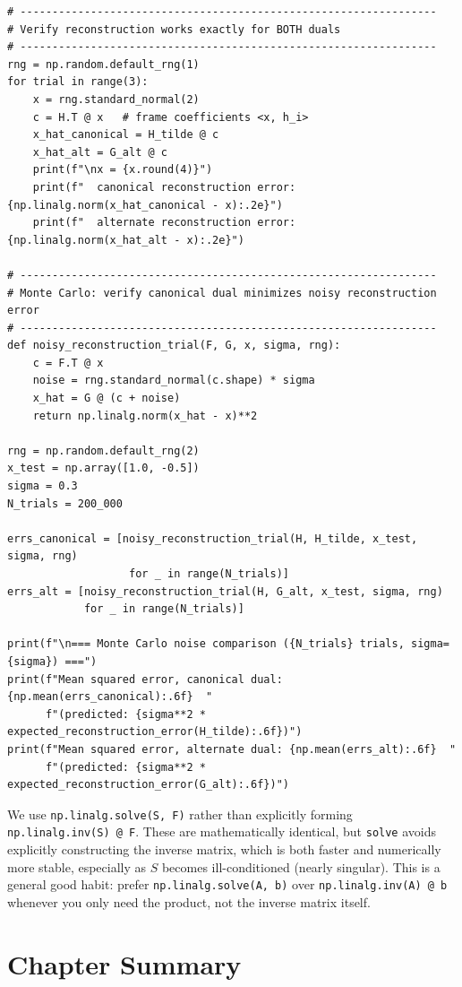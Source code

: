 \begin{lstlisting}[caption={Canonical and alternate dual frames, and stability comparison}]
# -----------------------------------------------------------------
# Verify reconstruction works exactly for BOTH duals
# -----------------------------------------------------------------
rng = np.random.default_rng(1)
for trial in range(3):
    x = rng.standard_normal(2)
    c = H.T @ x   # frame coefficients <x, h_i>
    x_hat_canonical = H_tilde @ c
    x_hat_alt = G_alt @ c
    print(f"\nx = {x.round(4)}")
    print(f"  canonical reconstruction error: {np.linalg.norm(x_hat_canonical - x):.2e}")
    print(f"  alternate reconstruction error: {np.linalg.norm(x_hat_alt - x):.2e}")

# -----------------------------------------------------------------
# Monte Carlo: verify canonical dual minimizes noisy reconstruction error
# -----------------------------------------------------------------
def noisy_reconstruction_trial(F, G, x, sigma, rng):
    c = F.T @ x
    noise = rng.standard_normal(c.shape) * sigma
    x_hat = G @ (c + noise)
    return np.linalg.norm(x_hat - x)**2

rng = np.random.default_rng(2)
x_test = np.array([1.0, -0.5])
sigma = 0.3
N_trials = 200_000

errs_canonical = [noisy_reconstruction_trial(H, H_tilde, x_test, sigma, rng)
                   for _ in range(N_trials)]
errs_alt = [noisy_reconstruction_trial(H, G_alt, x_test, sigma, rng)
            for _ in range(N_trials)]

print(f"\n=== Monte Carlo noise comparison ({N_trials} trials, sigma={sigma}) ===")
print(f"Mean squared error, canonical dual: {np.mean(errs_canonical):.6f}  "
      f"(predicted: {sigma**2 * expected_reconstruction_error(H_tilde):.6f})")
print(f"Mean squared error, alternate dual: {np.mean(errs_alt):.6f}  "
      f"(predicted: {sigma**2 * expected_reconstruction_error(G_alt):.6f})")
\end{lstlisting}

\begin{remark*}
We use \texttt{np.linalg.solve(S, F)} rather than explicitly forming
\texttt{np.linalg.inv(S) @ F}. These are mathematically identical, but
\texttt{solve} avoids explicitly constructing the inverse matrix, which
is both faster and numerically more stable, especially as $S$ becomes
ill-conditioned (nearly singular). This is a general good habit: prefer
\texttt{np.linalg.solve(A, b)} over \texttt{np.linalg.inv(A) @ b}
whenever you only need the product, not the inverse matrix itself.
\end{remark*}

\section{Chapter Summary}
\label{sec:summary-ch5}

